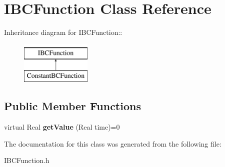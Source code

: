 \hypertarget{classIBCFunction}{
\section{IBCFunction Class Reference}
\label{classIBCFunction}
}
Inheritance diagram for IBCFunction::\begin{figure}[H]
\begin{center}
\leavevmode
\includegraphics[height=2cm]{classIBCFunction}
\end{center}
\end{figure}
\subsection*{Public Member Functions}
\begin{DoxyCompactItemize}
\item 
\hypertarget{classIBCFunction_af301369c2049187e033bf74c0acf487c}{
virtual Real {\bfseries getValue} (Real time)=0}
\label{classIBCFunction_af301369c2049187e033bf74c0acf487c}

\end{DoxyCompactItemize}


The documentation for this class was generated from the following file:\begin{DoxyCompactItemize}
\item 
IBCFunction.h\end{DoxyCompactItemize}
